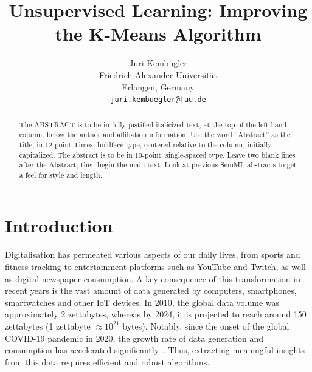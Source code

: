 \documentclass[10pt,twocolumn,letterpaper]{article}
\begin{document}
\title{Unsupervised Learning: Improving the K-Means Algorithm}

\author{Juri Kembügler\\
Friedrich-Alexander-Universität\\
Erlangen, Germany\\
{\tt\small\href{mailto:juri.kembuegler@fau.de}{juri.kembuegler@fau.de}}
}

\maketitle

\begin{abstract}
    The ABSTRACT is to be in fully-justified italicized text, at the top
    of the left-hand column, below the author and affiliation
    information. Use the word ``Abstract'' as the title, in 12-point
    Times, boldface type, centered relative to the column, initially
    capitalized. The abstract is to be in 10-point, single-spaced type.
    Leave two blank lines after the Abstract, then begin the main text.
    Look at previous SemML abstracts to get a feel for style and length.
\end{abstract}


\section{Introduction}\label{sec:introduction}

Digitalisation has permeated various aspects of our daily lives, from sports
and fitness tracking to entertainment platforms such as YouTube and Twitch, as
well as digital newspaper consumption. A key consequence of this transformation
in recent years is the vast amount of data generated by computers, smartphones,
smartwatches and other IoT devices. In 2010, the global data volume was
approximately 2 zettabytes, whereas by 2024, it is projected to reach around
150 zettabytes (1 zettabyte $\approx10^{21}$ bytes). Notably, since the onset
of the global COVID-19 pandemic in 2020, the growth rate of data generation and
consumption has accelerated significantly~\cite{IDC_Statista_2024}. Thus,
extracting meaningful insights from this data requires efficient and robust
algorithms.
\end{document}
